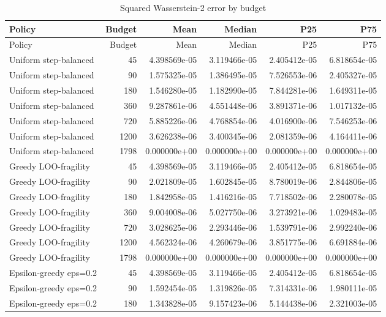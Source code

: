 \begin{scriptsize}
\begin{longtable}{lrrrrr}
\caption{Squared Wasserstein-2 error by budget}\label{tab:error-by-budget}\\
\toprule
Policy & Budget & Mean & Median & P25 & P75 \\
\midrule
\endfirsthead
\toprule
Policy & Budget & Mean & Median & P25 & P75 \\
\midrule
\endhead
Uniform step-balanced & 45 & 4.398569e-05 & 3.119466e-05 & 2.405412e-05 & 6.818654e-05 \\
Uniform step-balanced & 90 & 1.575325e-05 & 1.386495e-05 & 7.526553e-06 & 2.405327e-05 \\
Uniform step-balanced & 180 & 1.546280e-05 & 1.182990e-05 & 7.844281e-06 & 1.649311e-05 \\
Uniform step-balanced & 360 & 9.287861e-06 & 4.551448e-06 & 3.891371e-06 & 1.017132e-05 \\
Uniform step-balanced & 720 & 5.885226e-06 & 4.768854e-06 & 4.016900e-06 & 7.546253e-06 \\
Uniform step-balanced & 1200 & 3.626238e-06 & 3.400345e-06 & 2.081359e-06 & 4.164411e-06 \\
Uniform step-balanced & 1798 & 0.000000e+00 & 0.000000e+00 & 0.000000e+00 & 0.000000e+00 \\
Greedy LOO-fragility & 45 & 4.398569e-05 & 3.119466e-05 & 2.405412e-05 & 6.818654e-05 \\
Greedy LOO-fragility & 90 & 2.021809e-05 & 1.602845e-05 & 8.780019e-06 & 2.844806e-05 \\
Greedy LOO-fragility & 180 & 1.842958e-05 & 1.416216e-05 & 7.718502e-06 & 2.280078e-05 \\
Greedy LOO-fragility & 360 & 9.004008e-06 & 5.027750e-06 & 3.273921e-06 & 1.029483e-05 \\
Greedy LOO-fragility & 720 & 3.028625e-06 & 2.293446e-06 & 1.539791e-06 & 2.992240e-06 \\
Greedy LOO-fragility & 1200 & 4.562324e-06 & 4.260679e-06 & 3.851775e-06 & 6.691884e-06 \\
Greedy LOO-fragility & 1798 & 0.000000e+00 & 0.000000e+00 & 0.000000e+00 & 0.000000e+00 \\
Epsilon-greedy eps=0.2 & 45 & 4.398569e-05 & 3.119466e-05 & 2.405412e-05 & 6.818654e-05 \\
Epsilon-greedy eps=0.2 & 90 & 1.592454e-05 & 1.319826e-05 & 7.314331e-06 & 1.980111e-05 \\
Epsilon-greedy eps=0.2 & 180 & 1.343828e-05 & 9.157423e-06 & 5.144438e-06 & 2.321003e-05 \\

\end{longtable}
\end{scriptsize}
